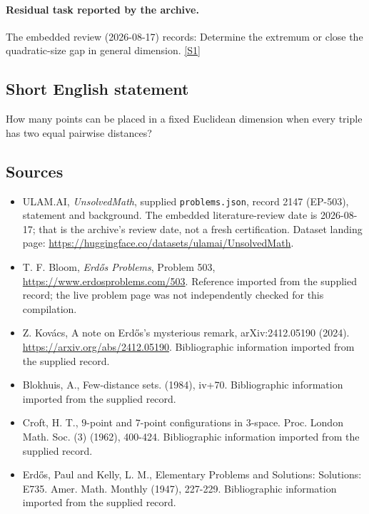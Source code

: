 \documentclass[11pt,a4paper]{article}
\newcommand{\sref}[2]{\hyperlink{source:#1:#2}{[S#2]}}
\begin{document}
\paragraph{Residual task reported by the archive.}

The embedded review (2026-08-17) records: Determine the extremum or close the quadratic-size gap in general dimension. \sref{2147}{1}

\subsection{Short English statement}

How many points can be placed in a fixed Euclidean dimension when every triple has two equal pairwise distances?

\subsection{Sources}

{\small

\begin{itemize}

\item[\hypertarget{source:2147:1}{S1}] ULAM.AI, \emph{UnsolvedMath}, supplied \texttt{problems.json}, record 2147 (EP-503), statement and background. The embedded literature-review date is 2026-08-17; that is the archive’s review date, not a fresh certification. Dataset landing page: \url{https://huggingface.co/datasets/ulamai/UnsolvedMath}.

\item[\hypertarget{source:2147:2}{S2}] T. F. Bloom, \emph{Erdős Problems}, Problem 503, \url{https://www.erdosproblems.com/503}. Reference imported from the supplied record; the live problem page was not independently checked for this compilation.

\item[\hypertarget{source:2147:3}{S3}] Z. Kovács, A note on Erdős's mysterious remark, arXiv:2412.05190 (2024). \url{https://arxiv.org/abs/2412.05190}. Bibliographic information imported from the supplied record.

\item[\hypertarget{source:2147:4}{S4}] Blokhuis, A., Few-distance sets. (1984), iv+70. Bibliographic information imported from the supplied record.

\item[\hypertarget{source:2147:5}{S5}] Croft, H. T., $9$-point and $7$-point configurations in $3$-space. Proc. London Math. Soc. (3) (1962), 400-424. Bibliographic information imported from the supplied record.

\item[\hypertarget{source:2147:6}{S6}] Erd\H{o}s, Paul and Kelly, L. M., Elementary Problems and Solutions: Solutions: E735. Amer. Math. Monthly (1947), 227-229. Bibliographic information imported from the supplied record.

\end{itemize}

}

\label{end:2147}
\end{document}
